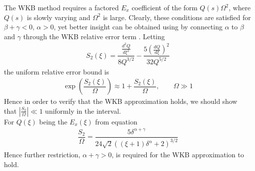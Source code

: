\documentclass[twocolumn,secnumarabic,amssymb, nobibnotes, aps, prd]{revtex4-1}
\begin{document}
The WKB method requires a factored $E_x$ coefficient of the form $Q(s) \Omega^2$, where $Q(s)$ is slowly varying and $\Omega^2$ is large. Clearly, these conditions are satisfied for $\beta+\gamma<0$, $\alpha >0$, yet better insight can be obtained using by connecting $\alpha$ to $\beta$ and $\gamma$ through the WKB relative error term      
\cite{BenderOrszag1999}. Letting 
\begin{align}
S_2(\xi) = \dfrac{\frac{d^2 Q}{d \xi^2}}{8 Q^{3/2}} - \dfrac{5\left( \frac{d Q}{d \xi} \right)^2}{32 Q^{5/2}}
\end{align}
the uniform relative error bound is 
\begin{align}
\label{eqns:WKBErrXi}
\exp \left(\dfrac{S_2(\xi)}{\Omega} \right) \approx 1+\dfrac{S_2(\xi)}{\Omega}, \qquad \Omega \gg 1 
\end{align}
Hence in order to verify that the WKB approximation holds, we should show that $\left \vert \frac{S_2}{\Omega} \right \vert \ll 1$ uniformly in the interval. \\
For $Q(\xi)$ being the $E_x(\xi)$ from equation   
\begin{align}
\dfrac{S_2}{\Omega} = \dfrac{5 \delta ^{\alpha +\gamma }}{24 \sqrt{2} \left((\xi  +1)\delta ^{\alpha}+2\right)^{3/2}}
\end{align}
Hence further restriction, $\alpha + \gamma >0$, is required for the WKB approximation to hold.
\end{document}

